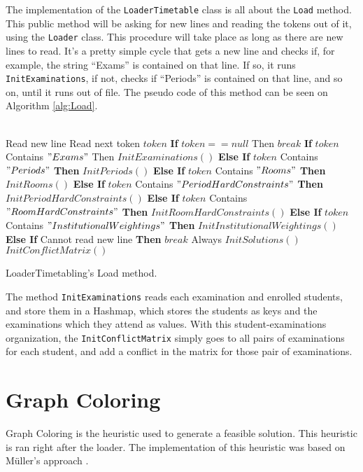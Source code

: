 The implementation of the \verb+LoaderTimetable+ class is all about the \verb+Load+ method. This public method will be asking for new lines and reading the tokens out of it, using the \verb+Loader+ class. This procedure will take place as long as there are new lines to read. It's a pretty simple cycle that gets a new line and checks if, for example, the string ``Exams'' is contained on that line. If so, it runs \verb+InitExaminations+, if not, checks if ``Periods'' is contained on that line, and so on, until it runs out of file. The pseudo code of this method can be seen on Algorithm \ref{alg:Load}.\\\\
\begin{algorithm}[b!]
\begin{algorithmic}
\State Read new line
\Repeat
	\State Read next token $token$
	\State \textbf{If} $token == null$ Then $break$ 
	\State \textbf{If} $token$ Contains $"Exams"$ Then $InitExaminations()$
	\State \textbf{Else If} $token$ Contains $"Periods"$ \textbf{Then} $InitPeriods()$
	\State \textbf{Else If} $token$ Contains $"Rooms"$ \textbf{Then} $InitRooms()$
	\State \textbf{Else If} $token$ Contains $"PeriodHardConstraints"$ \textbf{Then} $InitPeriodHardConstraints()$
	\State \textbf{Else If} $token$ Contains $"RoomHardConstraints"$ \textbf{Then} $InitRoomHardConstraints()$
	\State \textbf{Else If} $token$ Contains $"InstitutionalWeightings"$ \textbf{Then} $InitInstitutionalWeightings()$
	\State \textbf{Else If} Cannot read new line \textbf{Then} $break$ 
\Until Always
\State $InitSolutions()$
\State $InitConflictMatrix()$
\end{algorithmic}
\caption{LoaderTimetabling's Load method.}
\label{alg:Load}
\end{algorithm}
The method \verb+InitExaminations+ reads each examination and enrolled students, and store them in a Hashmap, which stores the students as keys and the examinations which they attend as values. With this student-examinations organization, the \verb+InitConflictMatrix+ simply goes to all pairs of examinations for each student, and add a conflict in the matrix for those pair of examinations.

\section{Graph Coloring}
\label{sec:GraphColoring}

Graph Coloring is the heuristic used to generate a feasible solution. This heuristic is ran right after the loader. The implementation of this heuristic was based on M\"{u}ller's approach \cite{Mueller2009}.\\

